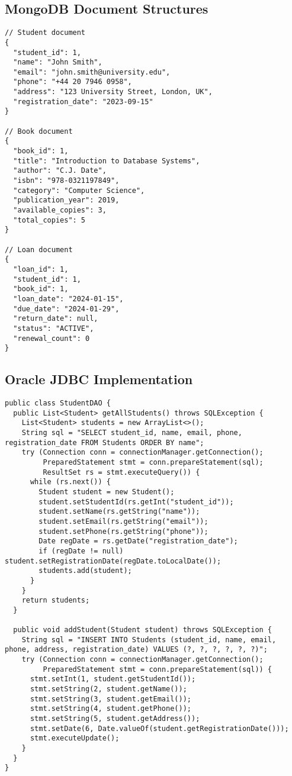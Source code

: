 \documentclass[12pt,a4paper]{article}
\begin{document}
\subsection{MongoDB Document Structures}
\begin{lstlisting}[style=java, caption=MongoDB Document Structures]
// Student document
{
  "student_id": 1,
  "name": "John Smith",
  "email": "john.smith@university.edu",
  "phone": "+44 20 7946 0958",
  "address": "123 University Street, London, UK",
  "registration_date": "2023-09-15"
}

// Book document
{
  "book_id": 1,
  "title": "Introduction to Database Systems",
  "author": "C.J. Date",
  "isbn": "978-0321197849",
  "category": "Computer Science",
  "publication_year": 2019,
  "available_copies": 3,
  "total_copies": 5
}

// Loan document
{
  "loan_id": 1,
  "student_id": 1,
  "book_id": 1,
  "loan_date": "2024-01-15",
  "due_date": "2024-01-29",
  "return_date": null,
  "status": "ACTIVE",
  "renewal_count": 0
}
\end{lstlisting}

\subsection{Oracle JDBC Implementation}
\begin{lstlisting}[style=java, caption=Oracle JDBC Implementation]
public class StudentDAO {
  public List<Student> getAllStudents() throws SQLException {
    List<Student> students = new ArrayList<>();
    String sql = "SELECT student_id, name, email, phone, registration_date FROM Students ORDER BY name";
    try (Connection conn = connectionManager.getConnection();
         PreparedStatement stmt = conn.prepareStatement(sql);
         ResultSet rs = stmt.executeQuery()) {
      while (rs.next()) {
        Student student = new Student();
        student.setStudentId(rs.getInt("student_id"));
        student.setName(rs.getString("name"));
        student.setEmail(rs.getString("email"));
        student.setPhone(rs.getString("phone"));
        Date regDate = rs.getDate("registration_date");
        if (regDate != null) student.setRegistrationDate(regDate.toLocalDate());
        students.add(student);
      }
    }
    return students;
  }

  public void addStudent(Student student) throws SQLException {
    String sql = "INSERT INTO Students (student_id, name, email, phone, address, registration_date) VALUES (?, ?, ?, ?, ?, ?)";
    try (Connection conn = connectionManager.getConnection();
         PreparedStatement stmt = conn.prepareStatement(sql)) {
      stmt.setInt(1, student.getStudentId());
      stmt.setString(2, student.getName());
      stmt.setString(3, student.getEmail());
      stmt.setString(4, student.getPhone());
      stmt.setString(5, student.getAddress());
      stmt.setDate(6, Date.valueOf(student.getRegistrationDate()));
      stmt.executeUpdate();
    }
  }
}
\end{lstlisting}
\end{document}
